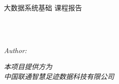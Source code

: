 \documentclass[
11pt, %
english, %
singlespacing, %
headsepline, %
]{MastersDoctoralThesis} %
\author{肖飞宇\quad牛苒\quad韦承志\quad沈磊\quad赵嘉欣\quad张玉生\quad李司棋\quad荆科
 } %
\begin{document}
\frontmatter %

\pagestyle{plain} %


\begin{titlepage}
\begin{center}

\vspace*{.06\textheight}
{\scshape\LARGE \univname\par}\vspace{1.5cm} %
\textsc{\LARGE 大数据系统基础 课程报告}\\[0.5cm] %

\HRule \\[0.4cm] %
{\huge \bfseries \ttitle\par}\vspace{0.4cm} %
\HRule \\[1.5cm] %
 
\begin{minipage}[t]{0.4\textwidth}
\begin{flushleft} \large
\emph{Author:}\\
\href{https://github.com/BigDataSystemTHU2018/Project-Unicom}{\authorname} %
\end{flushleft}
\end{minipage}

 
\vfill

\Large \textit{本项目提供方为} \\ \textit{中国联通智慧足迹数据科技有限公司}\\[1cm] %

 
\vfill


 
\vfill
\end{center}
\end{titlepage}

\end{document}
